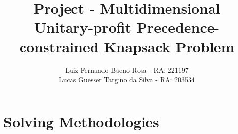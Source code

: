 \documentclass{article}
\title{Project -  Multidimensional Unitary-profit Precedence-constrained Knapsack Problem}
\author{
	Luiz Fernando Bueno Rosa - RA: 221197 \\
	Lucas Guesser Targino da Silva - RA: 203534
}
\theoremstyle{definition}
\begin{document}
\maketitle




\section{Solving Methodologies}










\end{document}
